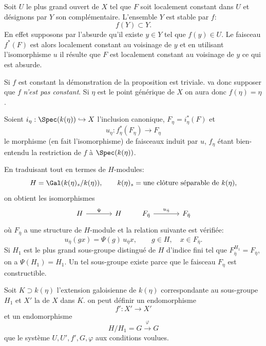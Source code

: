 \begin{prooftext}[Démonstration]
Soit $U$ le plus grand ouvert de $X$ tel que $F$ soit localement constant dans $U$ et désignons par $Y$ son complémentaire. L'ensemble $Y$ est stable par $f$:
\[
f(Y)\subset Y.
\]
En effet supposons par l'absurde qu'il existe $y\in Y$ tel que $f(y)\in U$. Le faisceau $f^*(F)$ est alors localement constant au voisinage de $y$ et en utilisant l'isomorphisme $u$ il résulte que $F$ est localement constant au voisinage de $y$ ce qui est absurde.

Si $f$ est constant la démonstration de la proposition est triviale.  va donc supposer que $f$ \emph{n'est pas constant}. Si $\eta$ est le point générique de $X$ on aura donc $f(\eta)=\eta$.

Soient $i_\eta:\Spec(k(\eta))\hookrightarrow X$ l'inclusion canonique, $F_\eta=i_\eta^*(F)$ et
\[
u_\eta:f_\eta^*(F_\eta)\longrightarrow F_\eta
\]
le morphisme (en fait l'isomorphisme) de faisceaux induit par $u$, $f_\eta$ étant bien-entendu la restriction de $f$ à $\Spec(k(\eta))$.

En traduisant tout en termes de $H$-modules:
\[
H=\Gal(k(\eta)_s/k(\eta)),\qquad k(\eta)_s=\text{une clôture séparable de }k(\eta),
\]
on obtient les isomorphismes
\[
\begin{tikzcd}[column sep=large]
H \arrow[r,"\Psi"] & H
\end{tikzcd}
\qquad
\begin{tikzcd}[column sep=large]
F_{\bar\eta} \arrow[r,"u_{\bar\eta}"] & F_{\bar\eta}
\end{tikzcd}
\]
où $F_{\bar\eta}$ a une structure de $H$-module et la relation suivante est vérifiée:
\[
u_{\bar\eta}(gx)=\Psi(g)\,u_{\bar\eta} x,
\qquad g\in H,
\quad x\in F_{\bar\eta}.
\]
Si $H_1$ est le plus grand sous-groupe distingué de $H$ d'indice fini tel que $F_{\bar\eta}^{H_1}=F_{\bar\eta}$, on a $\Psi(H_1)=H_1$. Un tel sous-groupe existe parce que le faisceau $F_\eta$ est constructible.

Soit $K\supset k(\eta)$ l'extension galoisienne de $k(\eta)$ correspondante au sous-groupe $H_1$ et $X'$ la  de $X$ dans $K$.  on peut définir un endomorphisme
\[
f':X'\longrightarrow X'
\]
et un endomorphisme
\[
H/H_1=G\xrightarrow{\varphi}G
\]
 que le système $U,U',f',G,\varphi$  aux conditions voulues.
\end{prooftext}

